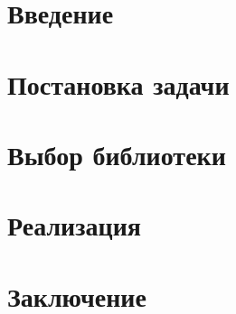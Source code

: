 


\usepackage{caption}
\usepackage{listings}




\maketitle
\setcounter{tocdepth}{2}
\tableofcontents

\section{Введение}
\label{sec:intro}


\section{Постановка задачи}
\label{sec:task}


\section{Выбор библиотеки}
\label{sec:libs}


\section{Реализация}
\label{sec:approach}


\section{Заключение}
\label{sec:conclusion}


\nocite{*}
\setmonofont[Mapping=tex-text]{CMU Typewriter Text}



